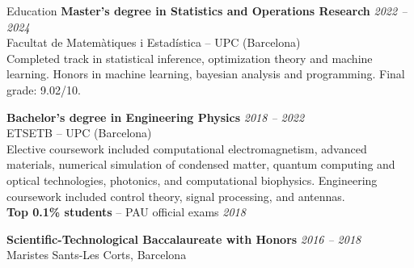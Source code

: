 \documentclass{resume} %
\begin{document}
\begin{rSection}{Education}
{\bf Master's degree in Statistics and Operations Research} \hfill {\em 2022 -- 2024} 
\\ Facultat de Matem\`atiques i Estad\'istica -- UPC (Barcelona) \vspace{0.5em} \\
Completed track in statistical inference, optimization theory and machine learning.
Honors in machine learning, bayesian analysis and programming. Final grade: 9.02/10.


{\bf Bachelor's degree in Engineering Physics} \hfill {\em 2018 -- 2022} 
\\ ETSETB -- UPC (Barcelona) \vspace{0.5em} \\ 
Elective coursework included computational electromagnetism, advanced materials, 
numerical simulation of condensed matter, quantum computing and optical technologies, photonics, and 
computational biophysics. Engineering coursework included control theory, signal processing, and antennas.\\

{\bf Top 0.1\% students} -- PAU official exams \hfill {\em 2018} 

{\bf Scientific-Technological Baccalaureate with Honors} \hfill {\em 2016 -- 2018} 
\\ Maristes Sants-Les Corts, Barcelona \\
\end{rSection}
\end{document}
